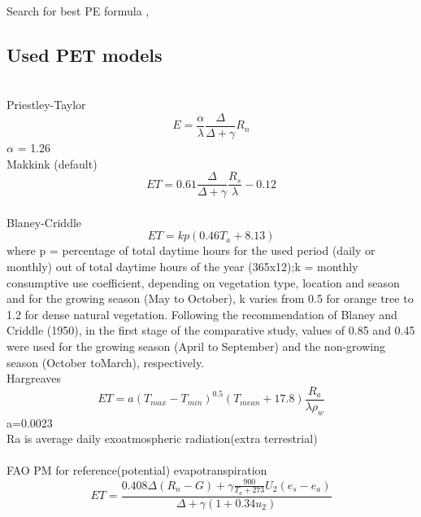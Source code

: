 \documentclass[hydrology,article,submit,moreauthors,pdftex]{Definitions/mdpi}
\begin{document}
Search for best PE formula \cite{jensen1990evapotranspiration}, \cite{xu2002cross}

\subsection{Used PET models}
\cite{xu2002cross} \\
Priestley-Taylor \cite{asce2005asce}
\begin{equation}
E = \frac{\alpha}{\lambda} \frac{\Delta}{\Delta +\gamma}R_{n}
\end{equation}
$\alpha$ = 1.26
\\
Makkink (default) \cite{asce2005asce} \cite{makkink1957testing}
\begin{equation}
ET = 0.61 \frac{\Delta}{\Delta+\gamma} \frac{R_s}{\lambda} -0.12 
\end{equation}
\\
Blaney-Criddle \cite{asce2005asce} \\
\begin{equation}
ET = kp (0.46T_a+8.13) 
\end{equation}
where p = percentage of total daytime hours for the used period (daily or
monthly) out of total daytime hours of the year (365x12);k = monthly consumptive use coefficient, depending on vegetation
type, location and season and for the growing season (May to October),
k varies from 0.5 for orange tree to 1.2 for dense natural
vegetation.
Following the recommendation of Blaney and Criddle (1950)\cite{blaney1950determining}, in the first stage of
the comparative study, values of 0.85 and 0.45 were used for the growing season
(April to September) and the non-growing season (October toMarch), respectively.
\\
Hargreaves \cite{hargreaves1975moisture}\cite{hargreaves1985reference}\cite{hargreaves1982estimating}
\begin{equation}
ET = a(T_{max}-T_{min})^{0.5}(T_{mean}+17.8) \frac{R_a}{\lambda \rho _w}
\end{equation}
a=0.0023 \\
Ra is average daily exoatmospheric radiation(extra terrestrial) \\
\\
FAO PM for reference(potential) evapotranspiration \cite{allen1998crop}
\begin{equation}
ET = \frac{0.408\Delta (R_{n}-G) + \gamma \frac{900}{T_a + 273} U_2 (e_{s}-e_{a})}{\Delta +\gamma (1+0.34u_2)}
\end{equation}
\\
\end{document}
